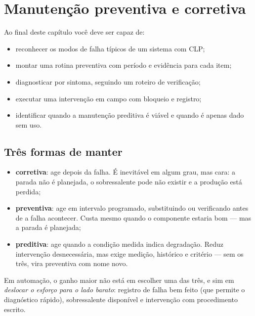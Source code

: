 \chapter{Manutenção preventiva e corretiva}
\label{cap:manutencao}

\begin{objetivos}
Ao final deste capítulo você deve ser capaz de:
\begin{itemize}
  \item reconhecer os modos de falha típicos de um sistema com CLP;
  \item montar uma rotina preventiva com período e evidência para cada item;
  \item diagnosticar por sintoma, seguindo um roteiro de verificação;
  \item executar uma intervenção em campo com bloqueio e registro;
  \item identificar quando a manutenção preditiva é viável e quando é apenas dado sem uso.
\end{itemize}
\end{objetivos}

\section{Três formas de manter}

\begin{itemize}
  \item \textbf{corretiva}: age depois da falha. É inevitável em algum grau, mas cara: a parada não é
        planejada, o sobressalente pode não existir e a produção está perdida;
  \item \textbf{preventiva}: age em intervalo programado, substituindo ou verificando antes de a falha
        acontecer. Custa mesmo quando o componente estaria bom --- mas a parada é planejada;
  \item \textbf{preditiva}: age quando a condição medida indica degradação. Reduz intervenção
        desnecessária, mas exige medição, histórico e critério --- sem os três, vira preventiva com
        nome novo.
\end{itemize}

Em automação, o ganho maior não está em escolher uma das três, e sim em \emph{deslocar o esforço para
o lado barato}: registro de falha bem feito (que permite o diagnóstico rápido), sobressalente
disponível e intervenção com procedimento escrito.


